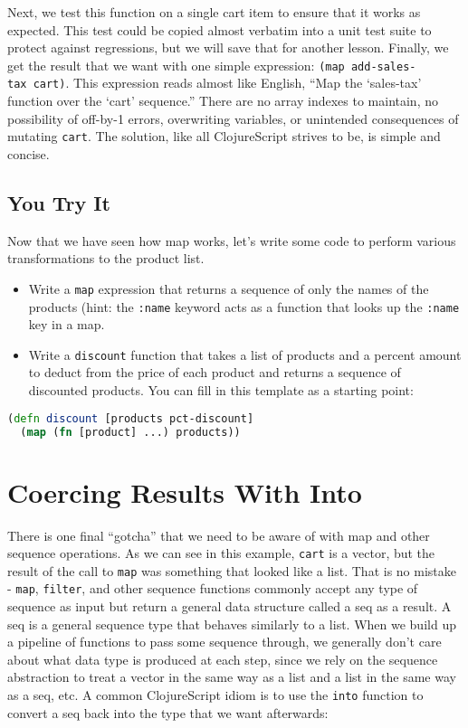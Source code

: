\documentclass[10pt,twoside,openright]{memoir}
\begin{document}
Next, we test this function on a single cart item to ensure that it
works as expected. This test could be copied almost verbatim into a unit
test suite to protect against regressions, but we will save that for
another lesson. Finally, we get the result that we want with one simple
expression: \texttt{(map\ add-sales-tax\ cart)}. This expression reads
almost like English, ``Map the `sales-tax' function over the `cart'
sequence.'' There are no array indexes to maintain, no possibility of
off-by-1 errors, overwriting variables, or unintended consequences of
mutating \texttt{cart}. The solution, like all ClojureScript strives to
be, is simple and concise.


\subsection{You Try It}

Now that we have seen how map works, let's write some code to perform
various transformations to the product list.

\begin{itemize}
\tightlist
\item
  Write a \texttt{map} expression that returns a sequence of only the
  names of the products (hint: the \texttt{:name} keyword acts as a
  function that looks up the \texttt{:name} key in a map.
\item
  Write a \texttt{discount} function that takes a list of products and a
  percent amount to deduct from the price of each product and returns a
  sequence of discounted products. You can fill in this template as a
  starting point:
\end{itemize}

\begin{lstlisting}[language=Clojure]
(defn discount [products pct-discount]
  (map (fn [product] ...) products))
\end{lstlisting}


\section{Coercing Results With Into}

There is one final ``gotcha'' that we need to be aware of with map and
other sequence operations. As we can see in this example, \texttt{cart}
is a vector, but the result of the call to \texttt{map} was something
that looked like a list. That is no mistake - \texttt{map},
\texttt{filter}, and other sequence functions commonly accept any type
of sequence as input but return a general data structure called a seq as
a result. A seq is a general sequence type that behaves similarly to a
list. When we build up a pipeline of functions to pass some sequence
through, we generally don't care about what data type is produced at
each step, since we rely on the sequence abstraction to treat a vector
in the same way as a list and a list in the same way as a seq, etc. A
common ClojureScript idiom is to use the \texttt{into} function to
convert a seq back into the type that we want afterwards:
\end{document}
